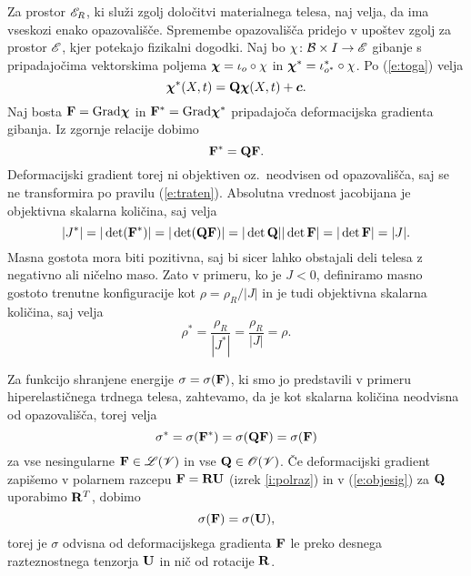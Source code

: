 Za prostor $\mathscr E_R$, ki služi zgolj določitvi materialnega telesa, naj velja,
da ima vseskozi enako opazovališče. Spremembe opazovališča pridejo v upoštev zgolj
za prostor $\mathscr E$, kjer potekajo fizikalni dogodki. Naj bo $\chi\colon\mathcal B\times I\to\mathscr E$
gibanje s pripadajočima vektorskima poljema $\boldsymbol \chi=\iota_o\circ\chi$ in
$\boldsymbol \chi^*=\iota^*_{o^*}\circ\chi$. Po (\ref{e:toga}) velja
\[
	\boldsymbol \chi^*(X,t)=\mathbf Q\boldsymbol \chi(X,t)+\boldsymbol c.
\]
Naj bosta $\mathbf F=\mathrm{Grad}\boldsymbol \chi$ in $\mathbf F^*=\mathrm{Grad}\boldsymbol \chi^*$ pripadajoča
deformacijska gradienta gibanja. Iz zgornje relacije dobimo
\[
	\mathbf F^*=\mathbf Q\mathbf F.
\]
Deformacijski gradient torej ni objektiven oz.~neodvisen od opazovališča, saj se ne
transformira po pravilu (\ref{e:traten}). Absolutna vrednost jacobijana je objektivna skalarna
količina, saj velja
\[
	|J^*|=|\det(\mathbf F^*)|=|\det(\mathbf Q\mathbf F)|=|\det\mathbf Q||\det\mathbf F|
	=|\det\mathbf F|=|J|.
\]
Masna gostota mora biti pozitivna, saj bi sicer lahko obstajali deli telesa
z negativno ali ničelno maso. Zato v primeru, ko je $J<0$, definiramo masno
gostoto trenutne konfiguracije kot $\rho=\rho_R/|J|$ in je tudi objektivna skalarna količina,
saj velja
\[ \rho^*=\frac{\rho_R}{|J^*|}=\frac{\rho_R}{|J|}=\rho. \]

Za funkcijo shranjene energije $\sigma=\sigma(\mathbf F)$, ki smo jo predstavili v primeru
hiperelastičnega trdnega telesa, zahtevamo, da je kot skalarna količina neodvisna
od opazovališča, torej velja
\begin{equation} \label{e:objesig}
	\sigma^*=\sigma(\mathbf F^*)=\sigma(\mathbf Q\mathbf F)=\sigma(\mathbf F)
\end{equation}
za vse nesingularne $\mathbf F\in\mathscr L(\mathscr V)$ in vse $\mathbf Q\in\mathscr{O}(\mathscr V)$.
Če deformacijski gradient zapišemo v polarnem razcepu $\mathbf F=\mathbf R\mathbf U$ (izrek \ref{i:polraz})
in v (\ref{e:objesig}) za $\mathbf Q$ uporabimo $\mathbf R^T$, dobimo
\begin{equation} \label{e:siuonly}
	\sigma(\mathbf F)=\sigma(\mathbf U),
\end{equation}
torej je $\sigma$ odvisna od deformacijskega gradienta $\mathbf F$ le preko desnega
razteznostnega tenzorja $\mathbf U$ in nič od rotacije $\mathbf R$.


